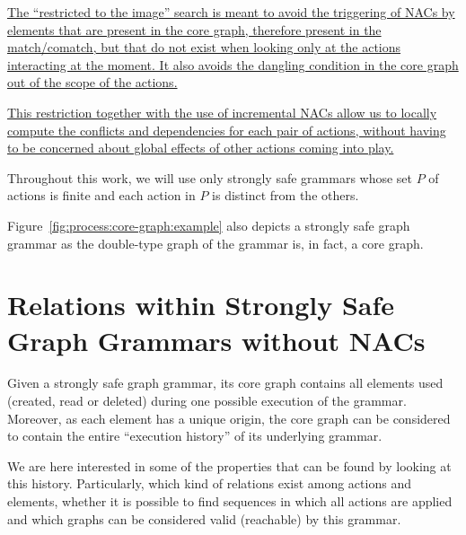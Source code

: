 \begin{definition}
  
  \uline{The ``restricted to the image'' search is meant to avoid the triggering of NACs by elements that are present in the core graph, therefore present in the match/comatch, but that do not exist when looking only at the actions interacting at the moment. It also avoids the dangling condition in the core graph out of the scope of the actions.}
  
  \uline{This restriction together with the use of incremental NACs allow us to locally compute the conflicts and dependencies for each pair of actions, without having to be concerned about global effects of other actions coming into play.}



\end{definition}

\begin{remark} Throughout this work, we will use only strongly safe grammars whose set $P$ of actions is finite and each action in $P$ is distinct from the others.

\end{remark}

\begin{example} Figure~\ref{fig:process:core-graph:example} also depicts a strongly safe graph grammar as the double-type graph of the grammar is, in fact, a core graph.
\end{example}

\section{Relations within Strongly Safe Graph Grammars without NACs}

Given a strongly safe graph grammar, its core graph contains all elements used (created, read or deleted) during one possible execution of the grammar. Moreover, as each element has a unique origin, the core graph can be considered to contain the entire ``execution history'' of its underlying grammar.

We are here interested in some of the properties that can be found by looking at this history. Particularly, which kind of relations exist among actions and elements, whether it is possible to find sequences in which all actions are applied and which graphs can be considered valid (reachable) by this grammar.

